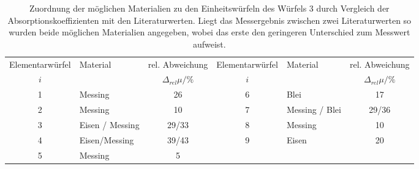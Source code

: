 \begin{table}[!h]
	\centering
\begin{adjustbox}{width=\textwidth}
	\begin{tabular}{clcclc}
		\toprule
		Elementarwürfel & Material & rel. Abweichung & Elementarwürfel & Material & rel. Abweichung\\
		$i$ & & $\Delta_{rel}\mu/\%$ & $i$ & &$\Delta_{rel}\mu /\%$\\
\midrule
		\num{1} & Messing & \num{26}   & \num{6}& Blei& \num{17}\\
		\num{2} & Messing & \num{10}& \num{7}& Messing / Blei & \num{29}/\num{36}\\
		\num{3} & Eisen / Messing  &\num{29}/\num{33} &\num{8}& Messing & \num{10}\\
		\num{4} & Eisen/Messing & \num{39}/\num{43}  & \num{9}& Eisen& \num{20}\\
		\num{5} & Messing & \num{5} &  &   &  \\
		
		\bottomrule
	\end{tabular}
\end{adjustbox}
	\caption{Zuordnung der möglichen Materialien zu den Einheitswürfeln des Würfels 3
		durch Vergleich der Absorptionskoeffizienten mit den Literaturwerten. Liegt das Messergebnis 
		zwischen zwei Literaturwerten so wurden beide möglichen Materialien angegeben, wobei das erste den
		geringeren Unterschied zum Messwert aufweist. \label{tab:Materialien_Block3}}
\end{table}
